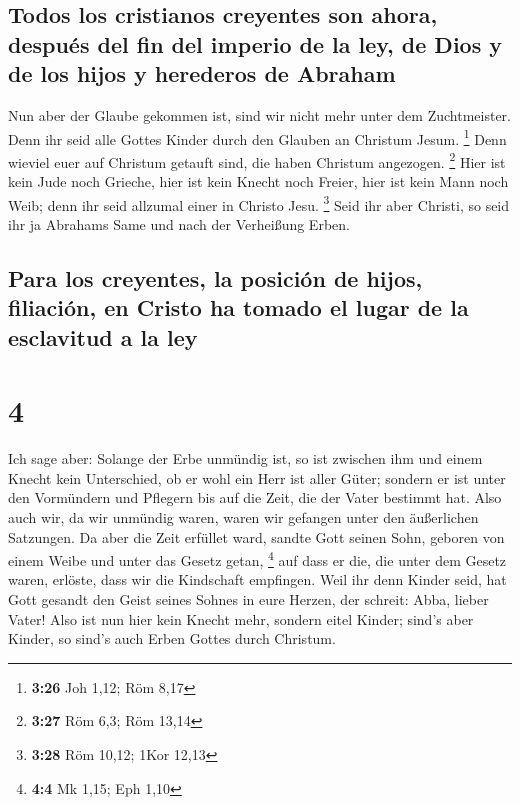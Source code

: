 \hypertarget{todos-los-cristianos-creyentes-son-ahora-despuuxe9s-del-fin-del-imperio-de-la-ley-de-dios-y-de-los-hijos-y-herederos-de-abraham}{%
\subsection{Todos los cristianos creyentes son ahora, después del fin
del imperio de la ley, de Dios y de los hijos y herederos de
Abraham}\label{todos-los-cristianos-creyentes-son-ahora-despuuxe9s-del-fin-del-imperio-de-la-ley-de-dios-y-de-los-hijos-y-herederos-de-abraham}}

 Nun aber der Glaube gekommen ist, sind wir nicht mehr
unter dem Zuchtmeister.  Denn ihr seid alle Gottes Kinder
durch den Glauben an Christum Jesum. \footnote{\textbf{3:26} Joh 1,12;
  Röm 8,17}  Denn wieviel euer auf Christum getauft sind,
die haben Christum angezogen. \footnote{\textbf{3:27} Röm 6,3; Röm 13,14}
 Hier ist kein Jude noch Grieche, hier ist kein Knecht
noch Freier, hier ist kein Mann noch Weib; denn ihr seid allzumal einer
in Christo Jesu. \footnote{\textbf{3:28} Röm 10,12; 1Kor 12,13}
 Seid ihr aber Christi, so seid ihr ja Abrahams Same und
nach der Verheißung Erben.

\hypertarget{para-los-creyentes-la-posiciuxf3n-de-hijos-filiaciuxf3n-en-cristo-ha-tomado-el-lugar-de-la-esclavitud-a-la-ley}{%
\subsection{Para los creyentes, la posición de hijos, filiación, en
Cristo ha tomado el lugar de la esclavitud a la
ley}\label{para-los-creyentes-la-posiciuxf3n-de-hijos-filiaciuxf3n-en-cristo-ha-tomado-el-lugar-de-la-esclavitud-a-la-ley}}

\hypertarget{section-3}{%
\section{4}\label{section-3}}

 Ich sage aber: Solange der Erbe unmündig ist, so ist
zwischen ihm und einem Knecht kein Unterschied, ob er wohl ein Herr ist
aller Güter;  sondern er ist unter den Vormündern und
Pflegern bis auf die Zeit, die der Vater bestimmt hat. 
Also auch wir, da wir unmündig waren, waren wir gefangen unter den
äußerlichen Satzungen.  Da aber die Zeit erfüllet ward,
sandte Gott seinen Sohn, geboren von einem Weibe und unter das Gesetz
getan, \footnote{\textbf{4:4} Mk 1,15; Eph 1,10}  auf dass
er die, die unter dem Gesetz waren, erlöste, dass wir die Kindschaft
empfingen.  Weil ihr denn Kinder seid, hat Gott gesandt
den Geist seines Sohnes in eure Herzen, der schreit: Abba, lieber Vater!
 Also ist nun hier kein Knecht mehr, sondern eitel Kinder;
sind's aber Kinder, so sind's auch Erben Gottes durch Christum.

